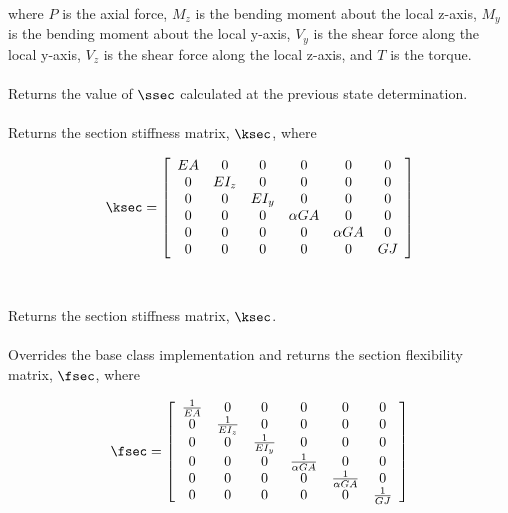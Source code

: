 where $P$ is the axial force, $M_z$ is the bending moment about the
local z-axis, $M_y$ is the bending moment about the local y-axis, 
$V_y$ is the shear force along the local y-axis, $V_z$ is the shear force
along the local z-axis, and $T$ is the torque. \\

 \\
Returns the value of $\ssec$ calculated at the previous state determination. \\

 \\
Returns the section stiffness matrix, $\ksec$, where 

\begin{equation}
\ksec = \left[
   \begin{array}{cccccc}
       EA &  0 &  0 & 0 & 0 & 0  \\
        0 & EI_z & 0 & 0 & 0 & 0 \\
        0 & 0 & EI_y & 0 & 0 & 0 \\
        0 & 0 & 0 & \alpha GA & 0 & 0 \\
        0 & 0 & 0 & 0 & \alpha GA & 0 \\
        0 & 0 & 0 & 0 & 0 & GJ
   \end{array} 
 \right]
\end{equation} \\

 \\
Returns the section stiffness matrix, $\ksec$. \\

 \\
Overrides the base class implementation and returns the section
flexibility matrix, $\fsec$, where

\begin{equation}
\fsec = \left[
   \begin{array}{cccccc}
       \frac{1}{EA} & 0 & 0 & 0 & 0 & 0 \\
       0 & \frac{1}{EI_z} & 0 & 0 & 0 & 0 \\
       0 & 0 & \frac{1}{EI_y} & 0 & 0 & 0 \\
       0 & 0 & 0 & \frac{1}{\alpha GA} & 0 & 0 \\ 
       0 & 0 & 0 & 0 & \frac{1}{\alpha GA} & 0 \\
       0 & 0 & 0 & 0 & 0 & \frac{1}{GJ}
   \end{array} 
 \right]
\end{equation} \\

